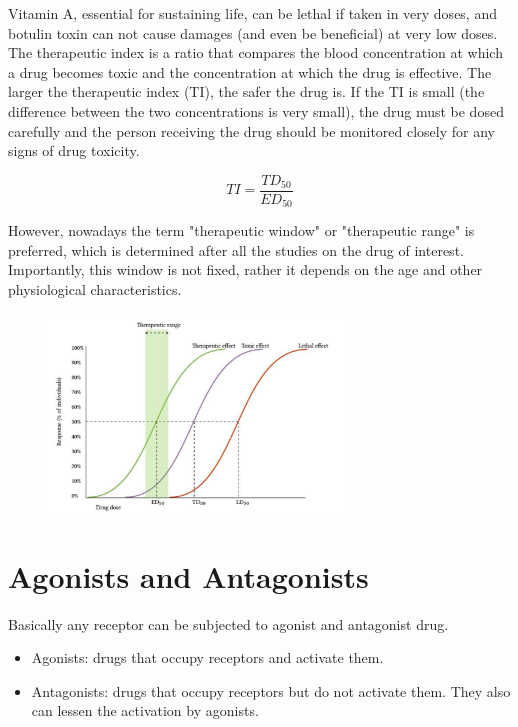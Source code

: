 \documentclass{book}
\begin{document}
Vitamin A, essential for sustaining life, can be lethal if taken in very doses, and botulin toxin can not cause damages (and even be beneficial) at very low doses.
\\
The therapeutic index is a ratio that compares the blood concentration at which a drug becomes toxic and the concentration at which the drug is effective. 
The larger the therapeutic index (TI), the safer the drug is. If the TI is small (the difference between the two concentrations is very small), the drug must be dosed carefully and the person receiving the drug should be monitored closely for any signs of drug toxicity.

\begin{equation*}
    TI = \frac{TD_{50}}{ED_{50}}
\end{equation*}

However, nowadays the term "therapeutic window" or "therapeutic range" is preferred, which is determined after all the studies on the drug of interest.
Importantly, this window is not fixed, rather it depends on the age and other physiological characteristics.

\begin{figure}[H]
    \includegraphics[width=0.7\textwidth, center]{images/image15.png}
    \caption{}
\end{figure}

\section{Agonists and Antagonists}

Basically any receptor can be subjected to agonist and antagonist drug.

\begin{itemize}
    \item Agonists: drugs that occupy receptors and activate them.
    \item Antagonists: drugs that occupy receptors but do not activate them. They also can lessen the activation by agonists.
\end{itemize}
\end{document}
